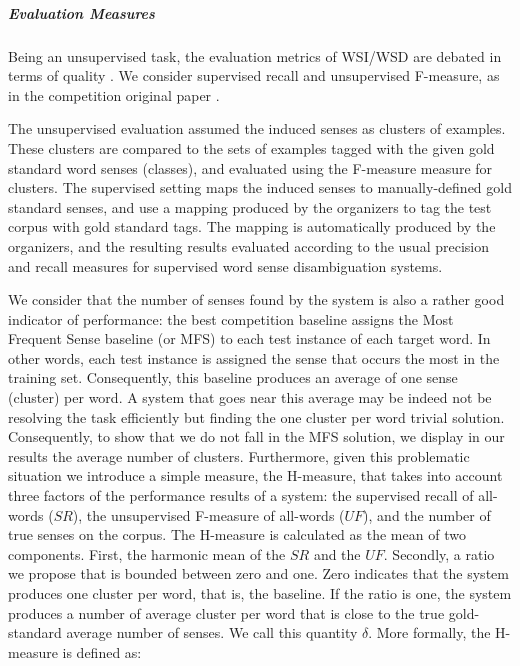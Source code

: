 \subparagraph{Evaluation Measures}
Being an unsupervised task, the evaluation metrics of WSI/WSD are debated in terms of quality \cite{CruysA11}. We consider supervised recall and unsupervised F-measure, as in the competition original paper \cite{Agirre2007}. 

The unsupervised evaluation assumed the induced senses as clusters of examples. These clusters are compared to the sets of examples tagged with the given gold standard word senses (classes), and evaluated using the F-measure measure for clusters. The supervised setting maps the induced senses to manually-defined gold standard senses, and use a mapping produced by the organizers to tag the test corpus with gold standard tags. The mapping is automatically produced by the organizers, and the resulting results evaluated according to the usual precision and recall measures for supervised word sense disambiguation systems. 


We consider that the number of senses found by the system is also a rather good indicator of performance: the best competition baseline assigns the Most Frequent Sense baseline (or MFS) to each test instance of each target word. In other words, each test instance is assigned the sense that occurs the most in the training set. Consequently, this baseline produces an average of one sense (cluster) per word. A system that goes near this average may be indeed not be resolving the task efficiently but finding the one cluster per word trivial solution. Consequently, to show that we do not fall in the MFS solution, we display in our results the average number of clusters. Furthermore, given this problematic situation we introduce a simple measure, the H-measure, that takes into account three factors of the performance results of a system: the supervised recall of all-words ($SR$), the unsupervised F-measure of all-words ($UF$), and the number of true senses on the corpus. The H-measure is calculated as the mean of two components. First, the harmonic mean of the $SR$ and the $UF$. Secondly, a ratio we propose that is bounded between zero and one. Zero indicates that the system produces one cluster per word, that is, the baseline. If the ratio is one, the system produces a number of average cluster per word that is close to the true gold-standard average number of senses. We call this quantity $\delta$. More formally, the H-measure is defined as:


